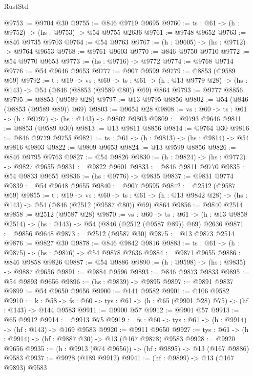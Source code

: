 \begin{lexlean}{RustStd}
\begin{coremodule}
@9753 := @9704 @30
@9755 := @846 @9719 @9695
@9760 := {ts : @61} -> (h : @9752) -> (hs : @9753) -> @54 @9755 @2636
@9761 := @9748 @9652
@9763 := @846 @9735 @9703
@9764 := @54 @9763
@9767 := (h : @9605) -> (hs : @9712) -> @9764 @9653
@9768 := @9761 @9603
@9770 := @846 @9750 @9710
@9772 := @54 @9770 @9653
@9773 := (hs : @9716) -> @9772
@9774 := @9768 @9714
@9776 := @54 @9646 @9653
@9777 := @907 @9599
@9779 := @8853 (@9589 @69)
@9792 := {t : @19} ->
  {vs : @60} ->
  {ts : @61} -> (h : @13 @9779 @28) -> (hs : @143) -> @54 (@846 (@8853 (@9589 @80)) @69) @864
@9793 := @9777 @8856
@9795 := @8853 (@9589 @28)
@9797 := @13 @9795 @8856
@9802 := @54 (@846 (@8853 (@9589 @89)) @69)
@9803 := @9654 @28
@9808 := {vs : @60} -> {ts : @61} -> (h : @9797) -> (hs : @143) -> @9802 @9803
@9809 := @9793 @9646
@9811 := @8853 (@9589 @30)
@9813 := @13 @9811 @8856
@9814 := @9764 @30
@9816 := @846 @9779 @9755
@9821 := {ts : @61} -> (h : @9813) -> (hs : @9814) -> @54 @9816 @9803
@9822 := @9809 @9653
@9824 := @13 @9599 @8856
@9826 := @846 @9795 @9763
@9827 := @54 @9826
@9830 := (h : @9824) -> (hs : @9772) -> @9827 @9655
@9831 := @9822 @9601
@9833 := @846 @9811 @9770
@9835 := @54 @9833 @9655
@9836 := (hs : @9776) -> @9835
@9837 := @9831 @9774
@9839 := @54 @9648 @9655
@9840 := @907 @9595
@9842 := @2512 (@9587 @69)
@9855 := {t : @19} ->
  {vs : @60} ->
  {ts : @61} -> (h : @13 @9842 @28) -> (hs : @143) -> @54 (@846 (@2512 (@9587 @80)) @69) @864
@9856 := @9840 @2514
@9858 := @2512 (@9587 @28)
@9870 := {vs : @60} ->
  {ts : @61} -> (h : @13 @9858 @2514) -> (hs : @143) -> @54 (@846 (@2512 (@9587 @89)) @69) @2636
@9871 := @9856 @9648
@9873 := @2512 (@9587 @30)
@9875 := @13 @9873 @2514
@9876 := @9827 @30
@9878 := @846 @9842 @9816
@9883 := {ts : @61} -> (h : @9875) -> (hs : @9876) -> @54 @9878 @2636
@9884 := @9871 @9655
@9886 := @846 @9858 @9826
@9887 := @54 @9886
@9890 := (h : @9598) -> (hs : @9835) -> @9887 @9656
@9891 := @9884 @9596
@9893 := @846 @9873 @9833
@9895 := @54 @9893 @9656
@9896 := (hs : @9839) -> @9895
@9897 := @9891 @9837
@9899 := @54 @9650 @9656
@9900 := @141 @9582
@9901 := @106 @9582
@9910 := {k : @58} ->
  {fs : @60} -> {tys : @61} -> (h : @65 (@9901 @28) @75) -> (hf : @143) -> @144 @9583
@9911 := @9900 @57
@9912 := @9901 @57
@9913 := @65 @9912
@9914 := @9913 @75
@9919 := {fs : @60} -> {tys : @61} -> (h : @9914) -> (hf : @143) -> @169 @9583
@9920 := @9911 @9650
@9927 := {tys : @61} -> (h : @9914) -> (hf : @9887 @30) -> @13 (@167 @9878) @9583
@9928 := @9920 @9656
@9935 := (h : @9913 (@74 @9656)) -> (hf : @9895) -> @13 (@167 @9886) @9583
@9937 := @9928 (@189 @9912)
@9941 := (hf : @9899) -> @13 (@167 @9893) @9583

\end{coremodule}
\end{lexlean}
